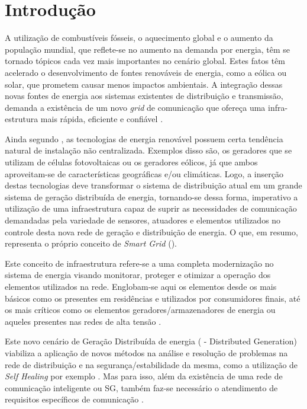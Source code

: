 \chapter{Introdução}
A utilização de combustíveis fósseis, o aquecimento global e o aumento da população mundial, que reflete-se no aumento na demanda por energia, têm se tornado tópicos cada vez mais importantes no cenário global. Estes fatos têm acelerado o desenvolvimento de fontes renováveis de energia, como a eólica ou solar, que prometem causar menos impactos ambientais. A integração dessas novas fontes de energia aos sistemas existentes de distribuição e transmissão, demanda a existência de um novo \emph{grid} de comunicação que ofereça uma infra-estrutura mais rápida, eficiente e confiável \cite{Art_Gungor2013}.

Ainda segundo \cite{Art_Gungor2013}, as tecnologias de energia renovável possuem certa tendência natural de instalação não centralizada. Exemplos disso são, os geradores que se utilizam de células fotovoltaicas ou os geradores eólicos, já que ambos aproveitam-se de características geográficas e/ou climáticas. Logo, a inserção destas tecnologias deve transformar o sistema de distribuição atual em um grande sistema de geração distribuída de energia, tornando-se dessa forma, imperativo a utilização de uma infraestrutura capaz de suprir as necessidades de comunicação demandadas pela variedade de sensores, atuadores e elementos utilizados no controle desta nova rede de geração e distribuição de energia. O que, em resumo, representa o próprio conceito de \emph{Smart Grid} ().

Este conceito de infraestrutura refere-se a uma completa modernização no sistema de energia visando monitorar, proteger e otimizar a operação dos elementos utilizados na rede. Englobam-se aqui os elementos desde os mais básicos como os presentes em residências e utilizados por consumidores finais, até os mais críticos como os elementos geradores/armazenadores de energia ou aqueles presentes nas redes de alta tensão \cite{Conf_Sood2009}.

Este novo cenário de Geração Distribuída de energia ( - Distributed Generation) viabiliza a aplicação de novos métodos na análise e resolução de problemas na rede de distribuição e na segurança/estabilidade da mesma, como a utilização de \emph{Self Healing} por exemplo \cite{Art_Amin2006}. Mas para isso, além da existência de uma rede de comunicação inteligente ou SG, também faz-se necessário o atendimento de requisitos específicos de comunicação \cite{Conf_Sood2009}.

